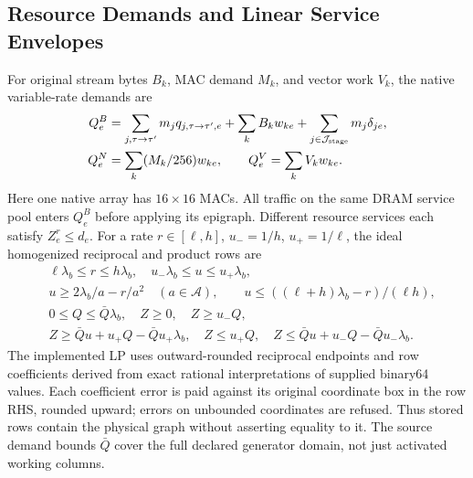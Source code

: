 \subsection{Resource Demands and Linear Service Envelopes}\label{app:rows_service}
For original stream bytes $B_k$, MAC demand $M_k$, and vector work $V_k$, the native variable-rate demands are
\begin{align}
 Q_e^B&=\sum_{j,\tau\to\tau'}m_jq_{j,\tau\to\tau',e}
          +\sum_k B_kw_{ke}+\sum_{j\in\mathcal J_{\rm stage}}m_j\delta_{je},
          \nonumber\\
 Q_e^N&=\sum_k (M_k/256)w_{ke},\qquad
 Q_e^V=\sum_k V_kw_{ke}.
 \label{eq:native_demands}
\end{align}
Here one native array has $16\times16$ MACs.
All traffic on the same DRAM service pool enters $Q_e^B$ before applying its epigraph.
Different resource services each satisfy $Z_e^r\le d_e$.
For a rate $r\in[\ell,h]$, $u_-=1/h$, $u_+=1/\ell$, the ideal homogenized reciprocal and product rows are
\begin{align}
 &\ell\lambda_b\le r\le h\lambda_b,\quad
 u_-\lambda_b\le u\le u_+\lambda_b,\nonumber\\
 &u\ge2\lambda_b/a-r/a^2\quad(a\in\mathcal A),\qquad
 u\le((\ell+h)\lambda_b-r)/(\ell h),\nonumber\\
 &0\le Q\le\bar Q\lambda_b,\quad Z\ge0,\quad Z\ge u_-Q,\nonumber\\
 &Z\ge\bar Q u+u_+Q-\bar Q u_+\lambda_b,\quad
 Z\le u_+Q,\quad Z\le\bar Q u+u_-Q-\bar Q u_-\lambda_b .
 \label{eq:native_envelopes}
\end{align}
The implemented LP uses outward-rounded reciprocal endpoints and row coefficients derived from exact rational interpretations of supplied binary64 values.
Each coefficient error is paid against its original coordinate box in the row RHS, rounded upward; errors on unbounded coordinates are refused.
Thus stored rows contain the physical graph without asserting equality to it.
The source demand bounds $\bar Q$ cover the full declared generator domain, not just activated working columns.

